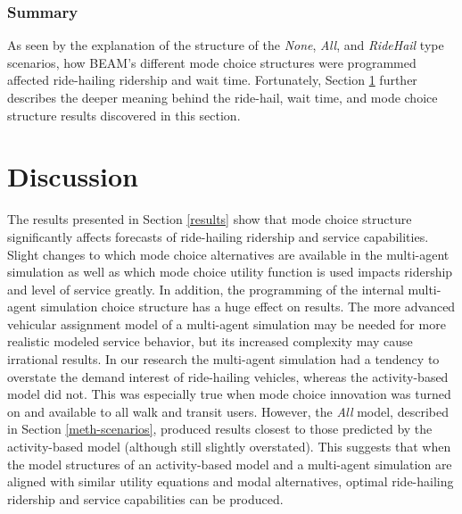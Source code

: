 \documentclass[fancy, masters]{byuthesis}
\begin{document}
\hypertarget{summary}{%
\subsection{Summary}\label{summary}}

As seen by the explanation of the structure of the \emph{None}, \emph{All}, and \emph{RideHail} type scenarios, how BEAM's different mode choice structures were programmed affected ride-hailing ridership and wait time. Fortunately, Section \ref{discussion} further describes the deeper meaning behind the ride-hail, wait time, and mode choice structure results discovered in this section.

\hypertarget{discussion}{%
\chapter{Discussion}\label{discussion}}

The results presented in Section \ref{results} show that mode choice structure significantly affects forecasts of ride-hailing ridership and service capabilities. Slight changes to which mode choice alternatives are available in the multi-agent simulation as well as which mode choice utility function is used impacts ridership and level of service greatly. In addition, the programming of the internal multi-agent simulation choice structure has a huge effect on results. The more advanced vehicular assignment model of a multi-agent simulation may be needed for more realistic modeled service behavior, but its increased complexity may cause irrational results. In our research the multi-agent simulation had a tendency to overstate the demand interest of ride-hailing vehicles, whereas the activity-based model did not. This was especially true when mode choice innovation was turned on and available to all walk and transit users. However, the \emph{All} model, described in Section \ref{meth-scenarios}, produced results closest to those predicted by the activity-based model (although still slightly overstated). This suggests that when the model structures of an activity-based model and a multi-agent simulation are aligned with similar utility equations and modal alternatives, optimal ride-hailing ridership and service capabilities can be produced.
\end{document}
